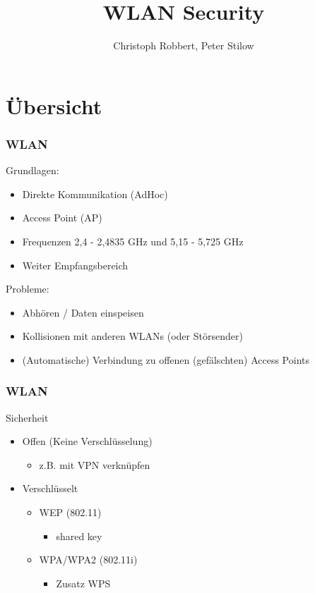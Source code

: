 \documentclass{beamer}
\author[C.Robbert, P. Stilow]{Christoph Robbert, Peter Stilow}
\institute[Uni Paderborn]{Universität Paderborn}
\title[WLAN Security]{WLAN Security}
\begin{document}
\begin{frame}
\maketitle
\end{frame}

\section{Übersicht}
\begin{frame}
\frametitle{WLAN}
Grundlagen:
\begin{itemize}
	\item Direkte Kommunikation (AdHoc)
	\item Access Point (AP)
	\item Frequenzen 2,4 - 2,4835 GHz und 5,15 - 5,725 GHz
	\item Weiter Empfangsbereich
\end{itemize}
Probleme:
\begin{itemize}
	\item Abhören / Daten einspeisen
	\item Kollisionen mit anderen WLANs (oder Störsender)
	\item (Automatische) Verbindung zu offenen (gefälschten) Access Points
\end{itemize}
\end{frame}

\begin{frame}
\frametitle{WLAN}
Sicherheit
\begin{itemize}
	\item Offen (Keine Verschlüsselung)
	\begin{itemize}
		\item z.B. mit VPN verknüpfen
	\end{itemize}
	\item Verschlüsselt
	\begin{itemize}
		\item WEP (802.11)
		\begin{itemize}
			\item shared key
		\end{itemize}
		\item WPA/WPA2 (802.11i)
		\begin{itemize}
			\item Zusatz WPS
		\end{itemize}
	\end{itemize}
\end{itemize}
\end{frame}
\end{document}
